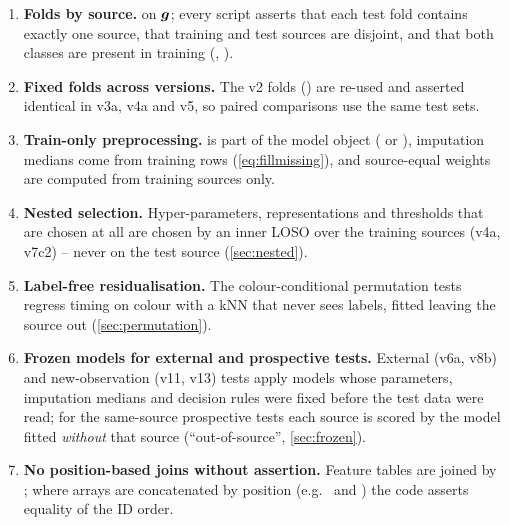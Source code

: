 \begin{enumerate}
\item \textbf{Folds by source.}  on $\bm{g}$; every script asserts that each test fold contains
exactly one source, that training and test sources are disjoint, and that both classes are present in training
(, ).
\item \textbf{Fixed folds across versions.} The v2 folds () are re-used and asserted
identical in v3a, v4a and v5, so paired comparisons use the same test sets.
\item \textbf{Train-only preprocessing.}  is part of the model object ( or
), imputation medians come from training rows (\cref{eq:fillmissing}), and source-equal weights are
computed from training sources only.
\item \textbf{Nested selection.} Hyper-parameters, representations and thresholds that are chosen at all are chosen by an
inner LOSO over the training sources (v4a, v7c2) -- never on the test source (\cref{sec:nested}).
\item \textbf{Label-free residualisation.} The colour-conditional permutation tests regress timing on colour with a kNN
that never sees labels, fitted leaving the source out (\cref{sec:permutation}).
\item \textbf{Frozen models for external and prospective tests.} External (v6a, v8b) and new-observation (v11, v13)
tests apply models whose parameters, imputation medians and decision rules were fixed before the test data were read;
for the same-source prospective tests each source is scored by the model fitted \emph{without} that source
(``out-of-source'', \cref{sec:frozen}).
\item \textbf{No position-based joins without assertion.} Feature tables are joined by ; where arrays are
concatenated by position (e.g.\  and ) the code asserts equality of the ID order.
\end{enumerate}
